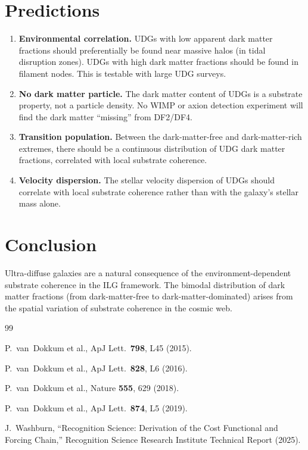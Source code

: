 \documentclass[12pt,a4paper]{article}
\theoremstyle{definition}
\theoremstyle{remark}
\begin{document}
\section{Predictions}
\label{sec:predict}

\begin{enumerate}
  \item \textbf{Environmental correlation.}  UDGs with low apparent
  dark matter fractions should preferentially be found near massive
  halos (in tidal disruption zones).  UDGs with high dark matter
  fractions should be found in filament nodes.  This is testable with
  large UDG surveys.

  \item \textbf{No dark matter particle.}  The dark matter content of
  UDGs is a substrate property, not a particle density.  No WIMP or
  axion detection experiment will find the dark matter ``missing''
  from DF2/DF4.

  \item \textbf{Transition population.}  Between the dark-matter-free
  and dark-matter-rich extremes, there should be a continuous
  distribution of UDG dark matter fractions, correlated with local
  substrate coherence.

  \item \textbf{Velocity dispersion.}  The stellar velocity dispersion
  of UDGs should correlate with local substrate coherence rather than
  with the galaxy's stellar mass alone.
\end{enumerate}

\section{Conclusion}
\label{sec:conclusion}

Ultra-diffuse galaxies are a natural consequence of the
environment-dependent substrate coherence in the ILG framework.
The bimodal distribution of dark matter fractions (from
dark-matter-free to dark-matter-dominated) arises from the spatial
variation of substrate coherence in the cosmic web.

\begin{thebibliography}{99}

P.~van~Dokkum et al., ApJ Lett.\ \textbf{798}, L45 (2015).

P.~van~Dokkum et al., ApJ Lett.\ \textbf{828}, L6 (2016).

P.~van~Dokkum et al., Nature \textbf{555}, 629 (2018).

P.~van~Dokkum et al., ApJ Lett.\ \textbf{874}, L5 (2019).

J.~Washburn, ``Recognition Science: Derivation of the Cost
Functional and Forcing Chain,'' Recognition Science Research
Institute Technical Report (2025).

\end{thebibliography}
\end{document}
